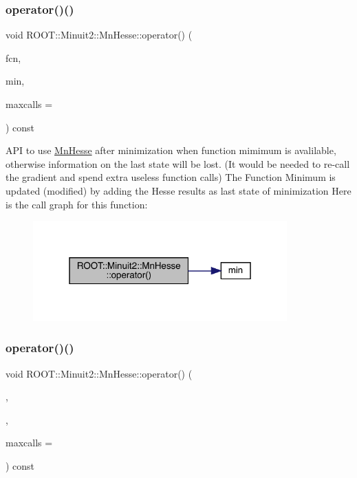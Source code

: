\subsubsection{\texorpdfstring{operator()()}{operator()()}\hspace{0.1cm}{\footnotesize\ttfamily [19/24]}}
{\footnotesize\ttfamily void R\+O\+O\+T\+::\+Minuit2\+::\+Mn\+Hesse\+::operator() (\begin{DoxyParamCaption}\item[{const \mbox{\hyperlink{classROOT_1_1Minuit2_1_1FCNBase}{F\+C\+N\+Base}} \&}]{fcn,  }\item[{\mbox{\hyperlink{classROOT_1_1Minuit2_1_1FunctionMinimum}{Function\+Minimum}} \&}]{min,  }\item[{unsigned int}]{maxcalls = {} }\end{DoxyParamCaption}) const}

A\+PI to use \mbox{\hyperlink{classROOT_1_1Minuit2_1_1MnHesse}{Mn\+Hesse}} after minimization when function mimimum is avalilable, otherwise information on the last state will be lost. (It would be needed to re-\/call the gradient and spend extra useless function calls) The Function Minimum is updated (modified) by adding the Hesse results as last state of minimization Here is the call graph for this function\+:
\nopagebreak
\begin{figure}[H]
\begin{center}
\leavevmode
\includegraphics[width=277pt]{d1/d02/classROOT_1_1Minuit2_1_1MnHesse_a3b6ba68a41260029bc6bde433170e600_cgraph}
\end{center}
\end{figure}
\mbox{\label{classROOT_1_1Minuit2_1_1MnHesse_a3b6ba68a41260029bc6bde433170e600}} 
\subsubsection{\texorpdfstring{operator()()}{operator()()}\hspace{0.1cm}{\footnotesize\ttfamily [20/24]}}
{\footnotesize\ttfamily void R\+O\+O\+T\+::\+Minuit2\+::\+Mn\+Hesse\+::operator() (\begin{DoxyParamCaption}\item[{const \mbox{\hyperlink{classROOT_1_1Minuit2_1_1FCNBase}{F\+C\+N\+Base}} \&}]{,  }\item[{\mbox{\hyperlink{classROOT_1_1Minuit2_1_1FunctionMinimum}{Function\+Minimum}} \&}]{,  }\item[{unsigned int}]{maxcalls = {} }\end{DoxyParamCaption}) const}

